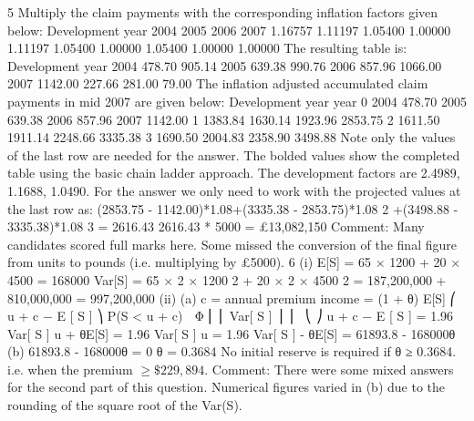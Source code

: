\documentclass[a4paper,12pt]{article}
\begin{document}
5
Multiply the claim payments with the corresponding inflation factors given below:
Development year
2004
2005
2006
2007
1.16757 1.11197 1.05400 1.00000
1.11197 1.05400 1.00000
1.05400 1.00000
1.00000
The resulting table is:
Development year
2004 478.70 905.14
2005 639.38 990.76
2006 857.96 1066.00
2007 1142.00
227.66
281.00
79.00
The inflation adjusted accumulated claim payments in mid 2007 are given below:
Development year
year
0
2004 478.70
2005 639.38
2006 857.96
2007 1142.00
1
1383.84
1630.14
1923.96
2853.75
2
1611.50
1911.14
2248.66
3335.38
3
1690.50
2004.83
2358.90
3498.88
Note only the values of the last row are needed for the answer.
The bolded values show the completed table using the basic chain ladder approach.
The development factors are 2.4989, 1.1688, 1.0490.
For the answer we only need to work with the projected values at the last row as:
(2853.75 - 1142.00)*1.08+(3335.38 - 2853.75)*1.08 2 +(3498.88 - 3335.38)*1.08 3
= 2616.43
2616.43 * 5000 = £13,082,150
Comment: Many candidates scored full marks here. Some missed the conversion of
the final figure from units to pounds (i.e. multiplying by £5000).
6
(i)
E[S]
= 65 × 1200 + 20 × 4500 = 168000
Var[S] = 65 × 2 × 1200 2 + 20 × 2 × 4500 2
= 187,200,000 + 810,000,000
= 997,200,000
(ii)
(a)
c = annual premium income = (1 + θ) E[S]
⎛ u + c − E [ S ] ⎞
P(S < u + c)  Φ ⎜
⎜ Var[ S ] ⎟ ⎟

⎝
⎠
u + c − E [ S ]
= 1.96
Var[ S ]
u + θE[S] = 1.96 Var[ S ]
u = 1.96 Var[ S ] - θE[S]
= 61893.8 - 168000θ
(b)
61893.8 - 168000θ = 0
θ = 0.3684
No initial reserve is required if θ ≥ 0.3684. i.e. when the premium $ \geq \$229,894$.
Comment: There were some mixed answers for the second part of this question.
Numerical figures varied in (b) due to the rounding of the square root of the
Var(S).
\end{document}
